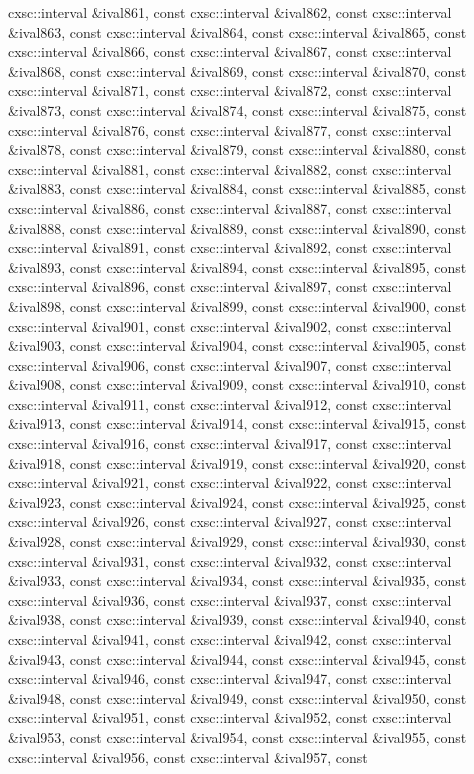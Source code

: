 \begin{DoxyCompactItemize}
cxsc\-::interval \&ival861, const cxsc\-::interval \&ival862, const cxsc\-::interval \&ival863, const cxsc\-::interval \&ival864, const cxsc\-::interval \&ival865, const cxsc\-::interval \&ival866, const cxsc\-::interval \&ival867, const cxsc\-::interval \&ival868, const cxsc\-::interval \&ival869, const cxsc\-::interval \&ival870, const cxsc\-::interval \&ival871, const cxsc\-::interval \&ival872, const cxsc\-::interval \&ival873, const cxsc\-::interval \&ival874, const cxsc\-::interval \&ival875, const cxsc\-::interval \&ival876, const cxsc\-::interval \&ival877, const cxsc\-::interval \&ival878, const cxsc\-::interval \&ival879, const cxsc\-::interval \&ival880, const cxsc\-::interval \&ival881, const cxsc\-::interval \&ival882, const cxsc\-::interval \&ival883, const cxsc\-::interval \&ival884, const cxsc\-::interval \&ival885, const cxsc\-::interval \&ival886, const cxsc\-::interval \&ival887, const cxsc\-::interval \&ival888, const cxsc\-::interval \&ival889, const cxsc\-::interval \&ival890, const cxsc\-::interval \&ival891, const cxsc\-::interval \&ival892, const cxsc\-::interval \&ival893, const cxsc\-::interval \&ival894, const cxsc\-::interval \&ival895, const cxsc\-::interval \&ival896, const cxsc\-::interval \&ival897, const cxsc\-::interval \&ival898, const cxsc\-::interval \&ival899, const cxsc\-::interval \&ival900, const cxsc\-::interval \&ival901, const cxsc\-::interval \&ival902, const cxsc\-::interval \&ival903, const cxsc\-::interval \&ival904, const cxsc\-::interval \&ival905, const cxsc\-::interval \&ival906, const cxsc\-::interval \&ival907, const cxsc\-::interval \&ival908, const cxsc\-::interval \&ival909, const cxsc\-::interval \&ival910, const cxsc\-::interval \&ival911, const cxsc\-::interval \&ival912, const cxsc\-::interval \&ival913, const cxsc\-::interval \&ival914, const cxsc\-::interval \&ival915, const cxsc\-::interval \&ival916, const cxsc\-::interval \&ival917, const cxsc\-::interval \&ival918, const cxsc\-::interval \&ival919, const cxsc\-::interval \&ival920, const cxsc\-::interval \&ival921, const cxsc\-::interval \&ival922, const cxsc\-::interval \&ival923, const cxsc\-::interval \&ival924, const cxsc\-::interval \&ival925, const cxsc\-::interval \&ival926, const cxsc\-::interval \&ival927, const cxsc\-::interval \&ival928, const cxsc\-::interval \&ival929, const cxsc\-::interval \&ival930, const cxsc\-::interval \&ival931, const cxsc\-::interval \&ival932, const cxsc\-::interval \&ival933, const cxsc\-::interval \&ival934, const cxsc\-::interval \&ival935, const cxsc\-::interval \&ival936, const cxsc\-::interval \&ival937, const cxsc\-::interval \&ival938, const cxsc\-::interval \&ival939, const cxsc\-::interval \&ival940, const cxsc\-::interval \&ival941, const cxsc\-::interval \&ival942, const cxsc\-::interval \&ival943, const cxsc\-::interval \&ival944, const cxsc\-::interval \&ival945, const cxsc\-::interval \&ival946, const cxsc\-::interval \&ival947, const cxsc\-::interval \&ival948, const cxsc\-::interval \&ival949, const cxsc\-::interval \&ival950, const cxsc\-::interval \&ival951, const cxsc\-::interval \&ival952, const cxsc\-::interval \&ival953, const cxsc\-::interval \&ival954, const cxsc\-::interval \&ival955, const cxsc\-::interval \&ival956, const cxsc\-::interval \&ival957, const 
\end{DoxyCompactItemize}
